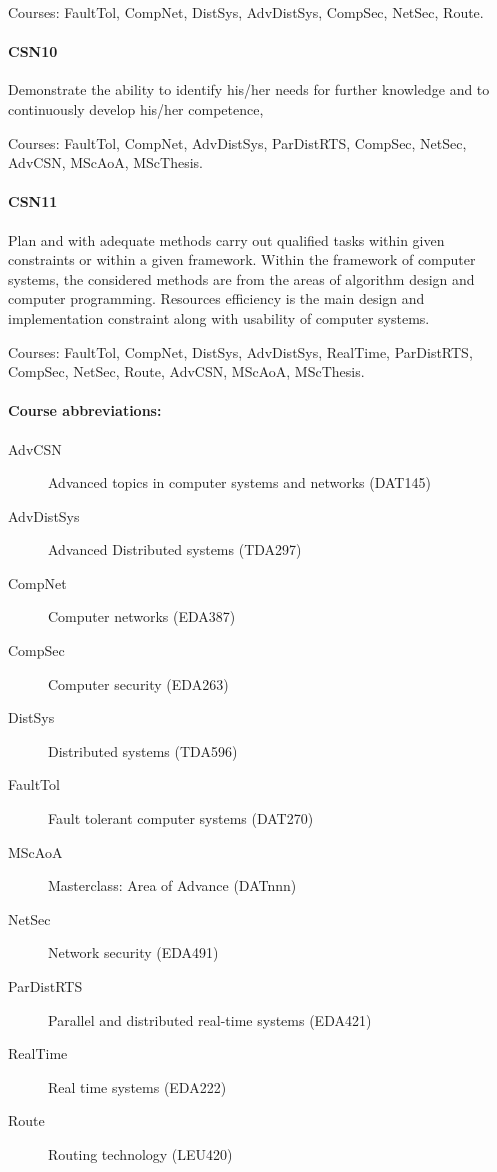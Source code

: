 Courses: FaultTol, CompNet, DistSys, AdvDistSys, CompSec, NetSec,
Route.

\paragraph{CSN10} Demonstrate the ability to identify his/her needs
for further knowledge and to continuously develop his/her competence,

Courses: FaultTol, CompNet, AdvDistSys, ParDistRTS, CompSec, NetSec,
AdvCSN, MScAoA, MScThesis.

\paragraph{CSN11} Plan and with adequate methods carry out qualified
tasks within given constraints or within a given framework. Within the
framework of computer systems, the considered methods are from the
areas of algorithm design and computer programming. Resources
efficiency is the main design and implementation constraint along with
usability of computer systems.

Courses: FaultTol, CompNet, DistSys, AdvDistSys, RealTime,
ParDistRTS, CompSec, NetSec, Route, AdvCSN, MScAoA, MScThesis.

\paragraph{Course abbreviations:}
\begin{description}
\item[AdvCSN    ] Advanced topics in computer systems and networks  (DAT145)
\item[AdvDistSys] Advanced Distributed systems                      (TDA297) 
\item[CompNet   ] Computer networks                                 (EDA387) 
\item[CompSec   ] Computer security                                 (EDA263) 
\item[DistSys   ] Distributed systems                               (TDA596) 
\item[FaultTol  ] Fault tolerant computer systems                   (DAT270) 
\item[MScAoA    ] Masterclass: Area of Advance                      (DATnnn) 
\item[NetSec    ] Network security                                  (EDA491) 
\item[ParDistRTS] Parallel and distributed real-time systems        (EDA421) 
\item[RealTime  ] Real time systems                                 (EDA222) 
\item[Route     ] Routing technology                                (LEU420) 
\end{description}

